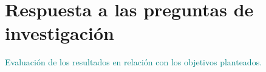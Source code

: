 \section{Respuesta a las preguntas de investigación}
\textcolor{teal}{Evaluación de los resultados en relación con los objetivos planteados.}
